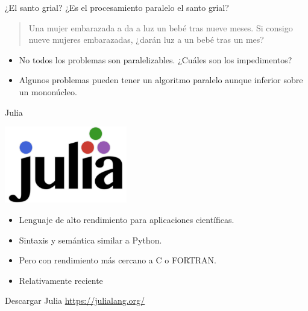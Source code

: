 \documentclass[bigger]{beamer}
\begin{document}
\begin{frame}[label={sec:org1f6147b}]{¿El santo grial?}
¿Es el procesamiento paralelo el santo grial?

\begin{quote}
Una mujer embarazada a da a luz un bebé tras nueve meses. Si consigo nueve mujeres embarazadas, ¿darán luz a un bebé tras un mes?
\end{quote}

\begin{itemize}
\item No todos los problemas son paralelizables. ¿Cuáles son los impedimentos?
\item Algunos problemas pueden tener un algoritmo paralelo aunque inferior sobre un mononúcleo.
\end{itemize}
\end{frame}

\begin{frame}[label={sec:org951f0c3}]{Julia}
\begin{center}
\includegraphics[width=0.4\textwidth]{./julia.png}
\end{center}

\begin{itemize}
\item Lenguaje de alto rendimiento para aplicaciones científicas.
\item Sintaxis y semántica similar a Python.
\item Pero con rendimiento más cercano a C o FORTRAN.
\item Relativamente reciente
\end{itemize}
\end{frame}

\begin{frame}[label={sec:org88e118e}]{Descargar Julia}
\url{https://julialang.org/}
\end{frame}
\end{document}
